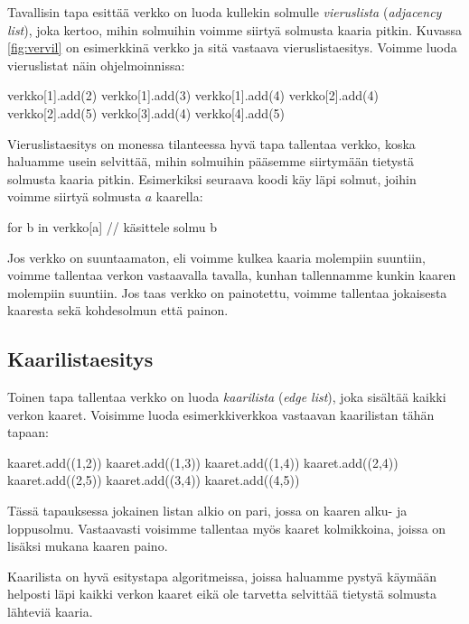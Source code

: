 Tavallisin tapa esittää verkko on luoda kullekin solmulle
\emph{vieruslista} (\emph{adjacency list}), joka kertoo, mihin solmuihin voimme
siirtyä solmusta kaaria pitkin.
Kuvassa \ref{fig:vervil} on esimerkkinä verkko
ja sitä vastaava vieruslistaesitys.
Voimme luoda vieruslistat näin ohjelmoinnissa:

\begin{code}
verkko[1].add(2)
verkko[1].add(3)
verkko[1].add(4)
verkko[2].add(4)
verkko[2].add(5)
verkko[3].add(4)
verkko[4].add(5)
\end{code}

Vieruslistaesitys on monessa tilanteessa hyvä tapa tallentaa verkko,
koska haluamme usein selvittää,
mihin solmuihin pääsemme siirtymään tietystä solmusta kaaria pitkin.
Esimerkiksi seuraava koodi käy läpi solmut,
joihin voimme siirtyä solmusta $a$ kaarella:

\begin{code}
for b in verkko[a]
    // käsittele solmu b
\end{code}

Jos verkko on suuntaamaton, eli voimme kulkea kaaria molempiin suuntiin,
voimme tallentaa verkon vastaavalla tavalla,
kunhan tallennamme kunkin kaaren molempiin suuntiin.
Jos taas verkko on painotettu, voimme tallentaa jokaisesta
kaaresta sekä kohdesolmun että painon.

\subsection{Kaarilistaesitys}


Toinen tapa tallentaa verkko on luoda \emph{kaarilista}
(\emph{edge list}),
joka sisältää kaikki verkon kaaret.
Voisimme luoda esimerkkiverkkoa vastaavan kaarilistan
tähän tapaan:

\begin{code}
kaaret.add((1,2))
kaaret.add((1,3))
kaaret.add((1,4))
kaaret.add((2,4))
kaaret.add((2,5))
kaaret.add((3,4))
kaaret.add((4,5))
\end{code}

Tässä tapauksessa jokainen listan alkio on pari,
jossa on kaaren alku- ja loppusolmu.
Vastaavasti voisimme tallentaa myös kaaret kolmikkoina,
joissa on lisäksi mukana kaaren paino.

Kaarilista on hyvä esitystapa algoritmeissa,
joissa haluamme pystyä käy\-mään helposti läpi
kaikki verkon kaaret eikä ole tarvetta
selvittää tietystä solmusta lähteviä kaaria.

